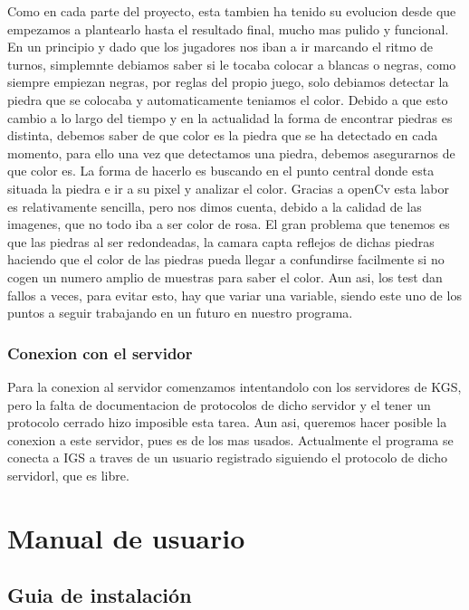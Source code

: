 \documentclass[12pt,a4paper]{report}
\begin{document}
Como en cada parte del proyecto, esta tambien ha tenido su evolucion desde que
empezamos a plantearlo hasta el resultado final, mucho mas pulido y funcional.
En un principio y dado que los jugadores nos iban a ir marcando el ritmo de
turnos, simplemnte debiamos saber si le tocaba colocar a blancas o negras, como
siempre empiezan negras, por reglas del propio juego, solo debiamos detectar la
piedra que se colocaba y automaticamente teniamos el color.  Debido a que esto
cambio a lo largo del tiempo y en la actualidad la forma de encontrar piedras es
distinta, debemos saber de que color es la piedra que se ha detectado en cada
momento, para ello una vez que detectamos una piedra, debemos asegurarnos de que
color es. La forma de hacerlo es buscando en el punto central donde esta situada
la piedra e ir a su pixel y analizar el color. Gracias a openCv esta labor es
relativamente sencilla, pero nos dimos cuenta, debido a la calidad de las
imagenes, que no todo iba a ser color de rosa. El gran problema que tenemos es
que las piedras al ser redondeadas, la camara capta reflejos de dichas piedras
haciendo que el color de las piedras pueda llegar a confundirse facilmente si no
cogen un numero amplio de muestras para saber el color. Aun asi, los test dan
fallos a veces, para evitar esto, hay que variar una variable, siendo este uno
de los puntos a seguir trabajando en un futuro en nuestro programa.


\subsection{Conexion con el servidor}

Para la conexion al servidor comenzamos intentandolo con los servidores de KGS,
pero la falta de documentacion de protocolos de dicho servidor y el tener un
protocolo cerrado hizo imposible esta tarea. Aun asi, queremos hacer posible la
conexion a este servidor, pues es de los mas usados. Actualmente el programa se
conecta a IGS a traves de un usuario registrado siguiendo el protocolo de dicho
servidorl, que es libre.


 
\chapter{Manual de usuario}

\section{Guia de instalación} 
\end{document}
